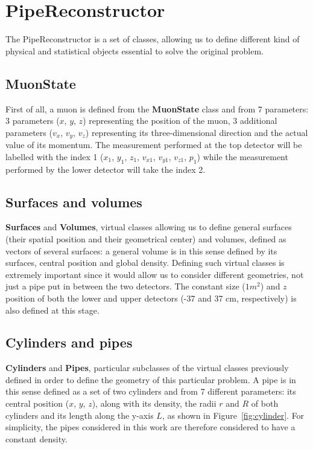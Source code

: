 \documentclass[a4paper, 11pt]{report}
\begin{document}
\section{PipeReconstructor} \label{sec:PipeReconstructor}

The PipeReconstructor is a set of classes, allowing us to define different kind of physical and statistical objects essential to solve the original problem.

\subsection{MuonState}

First of all, a muon is defined from the \textbf{MuonState} class and from 7 parameters: 3 parameters ($x$, $y$, $z$) representing the position of the muon, 3 additional parameters ($v_x$, $v_y$, $v_z$) representing its three-dimensional direction and the actual value of its momentum. The measurement performed at the top detector will be labelled with the index 1 ($x_1$, $y_1$, $z_1$, $v_{x1}$, $v_{y1}$, $v_{z1}$, $p_1$) while the measurement performed by the lower detector will take the index 2.

\subsection{Surfaces and volumes}

\textbf{Surfaces} and \textbf{Volumes}, virtual classes allowing us to define general surfaces (their spatial position and their geometrical center) and volumes, defined as vectors of several surfaces: a general volume is in this sense defined by its surfaces, central position and global density. Defining such virtual classes is extremely important since it would allow us to consider different geometries, not just a pipe put in between the two detectors. The constant size ($1 m^2$) and $z$ position of both the lower and upper detectors (-37 and 37 cm, respectively) is also defined at this stage.

\subsection{Cylinders and pipes}

\textbf{Cylinders} and \textbf{Pipes}, particular subclasses of the virtual classes previously defined in order to define the geometry of this particular problem. A pipe is in this sense defined as a set of two cylinders and from 7 different parameters: its central position ($x$, $y$, $z$), along with its density, the radii $r$ and $R$ of both cylinders and its length along the y-axis $L$, as shown in Figure~\ref{fig:cylinder}. For simplicity, the pipes considered in this work are therefore considered to have a constant density.
\end{document}
